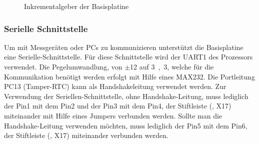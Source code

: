 \begin{figure}[htb]
    \centering
    \qquad
    \qquad
    \caption[Inkrementalgeber der Basisplatine]{Inkrementalgeber der \gls{Basisplatine}}
    \label{fig:basisplatine-ink}
\end{figure}

\subsubsection{Serielle Schnittstelle}
Um mit Messgeräten oder PCs zu kommunizieren unterstützt die \gls{Basisplatine} eine Serielle-Schnittstelle. Für diese Schnittstelle wird der UART1 des Prozessors verwendet. Die Pegelumwandlung, von $\pm$\unit{12}{\volt} auf \unit{3,3}{\volt}, welche für die Kommunikation benötigt werden erfolgt mit Hilfe eines MAX232. Die Portleitung PC13 (Tamper-RTC) kann als Handshakeleitung verwendet werden. Zur Verwendung der Seriellen-Schnittstelle, ohne Handshake-Leitung, muss lediglich der Pin1 mit dem Pin2 und der Pin3 mit dem Pin4, der Stiftleiste (, X17) miteinander mit Hilfe eines Jumpers verbunden werden. Sollte man die Handshake-Leitung verwenden möchten, muss lediglich der Pin5 mit dem Pin6, der Stiftleiste (, X17) miteinander verbunden werden.

